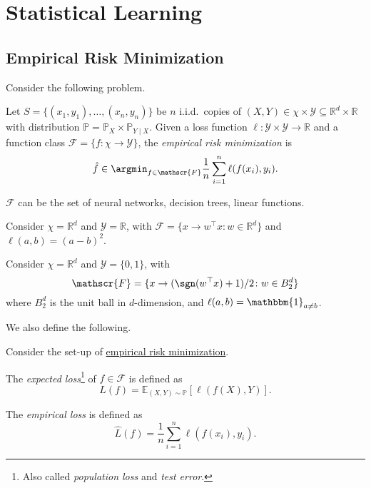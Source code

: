 \section{Statistical Learning}
\subsection{Empirical Risk Minimization}
Consider the following problem.

\begin{problem}\label{prb:ERM}
Let \(S = \{ (x_1, y_1) , \dots , (x_n, y_n)\} \) be \(n\) i.i.d.\ copies of \((X, Y) \in \chi \times \mathcal{Y} \subseteq \mathbb{R} ^d\times \mathbb{R}\) with distribution \(\mathbb{P} = \mathbb{P} _X \times \mathbb{P} _{Y \mid X}\). Given a loss function \(\ell \colon \mathcal{Y} \times \mathcal{Y} \to \mathbb{R}\) and a function class \(\mathscr{F} = \{ f\colon \chi \to \mathcal{Y}  \} \), the \emph{empirical risk minimization} is
\[
	\hat{f} \in \argmin_{f\in \mathscr{F} } \frac{1}{n}\sum_{i=1}^{n} \ell (f(x_i), y_i).
\]
\end{problem}

\begin{eg}
	\(\mathscr{F} \) can be the set of neural networks, decision trees, linear functions.
\end{eg}

\begin{eg}
	Consider \(\chi = \mathbb{R} ^d\) and \(\mathcal{Y} = \mathbb{R} \), with \(\mathscr{F} = \{ x \to w^{\top} x \colon w\in \mathbb{R} ^d \} \) and \(\ell (a, b) = (a - b)^2\).
\end{eg}

\begin{eg}
	Consider \(\chi = \mathbb{R} ^d\) and \(\mathcal{Y} = \{ 0, 1 \} \), with
	\[
		\mathscr{F} = \{ x \to (\sgn (w^{\top} x ) + 1)/ 2 \colon w\in B_2^d \}
	\]
	where \(B_2^d\) is the unit ball in \(d\)-dimension, and \(\ell (a, b) = \mathbbm{1}_{a \neq b} \).
\end{eg}

We also define the following.

\begin{definition*}
	Consider the set-up of \hyperref[prb:ERM]{empirical risk minimization}.
	\begin{definition}\label{def:expected-loss}
		The \emph{expected loss}\footnote{Also called \emph{population loss} and \emph{test error}.} of \(f\in \mathscr{F} \) is defined as
		\[
			L(f) = \mathbb{E}_{(X, Y) \sim \mathbb{P} }\left[\ell (f(X), Y) \right].
		\]
	\end{definition}

	\begin{definition}\label{def:empirical-loss}
		The \emph{empirical loss} is defined as
		\[
			\hat{L} (f) = \frac{1}{n}\sum_{i=1}^{n} \ell (f(x_i), y_i).
		\]
	\end{definition}
\end{definition*}

